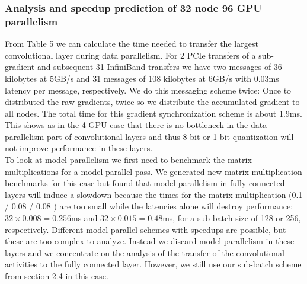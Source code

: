 \documentclass{article} %
\begin{document}
\subsubsection{Analysis and speedup prediction of 32 node 96 GPU parallelism}

From Table 5 we can calculate the time needed to transfer the largest convolutional layer during data parallelism. For 2 PCIe transfers of a sub-gradient and subsequent 31 InfiniBand transfers we have two messages of 36 kilobytes at 5GB/s and 31 messages of 108 kilobytes at 6GB/s with 0.03ms latency per message, respectively. We do this messaging scheme twice: Once to distributed the raw gradients, twice so we distribute the accumulated gradient to all nodes. The total time for this gradient synchronization scheme is about 1.9ms. This shows as in the 4 GPU case that there is no bottleneck in the data parallelism part of convolutional layers and thus 8-bit or 1-bit quantization will not improve performance in these layers. \\

To look at model parallelism we first need to benchmark the matrix multiplications for a model parallel pass. We generated new matrix multiplication benchmarks for this case but found that model parallelism in fully connected layers will induce a slowdown because the times for the matrix multiplication (0.1 / 0.08 / 0.08 ) are too small while the latencies alone will destroy performance: $32\times 0.008 = 0.256$ms and $32\times 0.015 = 0.48$ms, for a sub-batch size of 128 or 256, respectively. Different model parallel schemes with speedups are possible, but these are too complex to analyze. Instead we discard model parallelism in these layers and we concentrate on the analysis of the transfer of the convolutional activities to the fully connected layer. However, we still use our sub-batch scheme from section 2.4 in this case.
\end{document}
